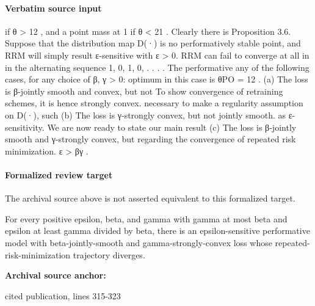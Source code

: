 \documentclass[10pt]{article}
\begin{document}
\paragraph{Verbatim source input}
\begin{ReviewVerbatim}
if θ > 12 , and a point mass at 1 if θ < 21 . Clearly there is     Proposition 3.6. Suppose that the distribution map D(·) is
no performatively stable point, and RRM will simply result         ε-sensitive with ε > 0. RRM can fail to converge at all in
in the alternating sequence 1, 0, 1, 0, . . . . The performative   any of the following cases, for any choice of β, γ > 0:
optimum in this case is θPO = 12 .
                                                                    (a) The loss is β-jointly smooth and convex, but not
To show convergence of retraining schemes, it is hence                  strongly convex.
necessary to make a regularity assumption on D(·), such             (b) The loss is γ-strongly convex, but not jointly smooth.
as ε-sensitivity. We are now ready to state our main result         (c) The loss is β-jointly smooth and γ-strongly convex, but
regarding the convergence of repeated risk minimization.                ε > βγ .
\end{ReviewVerbatim}


\paragraph{Formalized review target}
The archival source above is not asserted equivalent to this formalized target.
\begin{ReviewVerbatim}
For every positive epsilon, beta, and gamma with gamma at most beta and epsilon at least gamma divided by beta, there is an epsilon-sensitive performative model with beta-jointly-smooth and gamma-strongly-convex loss whose repeated-risk-minimization trajectory diverges.
\end{ReviewVerbatim}

\textbf{Archival source anchor:} {\footnotesize\raggedright cited publication, lines 315-\allowbreak{}323\par}
\end{document}
